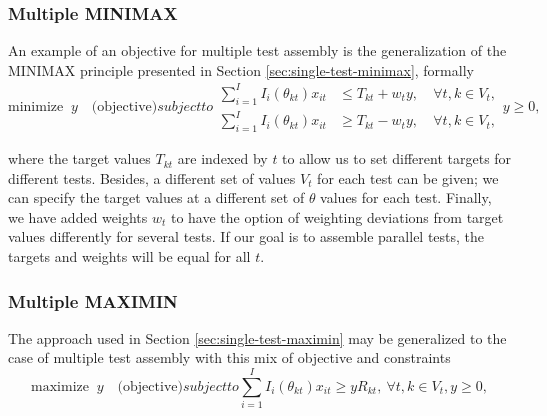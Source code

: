 \subsubsection{Multiple MINIMAX}

An example of an objective for multiple test assembly is the generalization of the MINIMAX principle presented in Section \ref{sec:single-test-minimax}, formally
\begin{subequations}
	\begin{equation}
	\mbox{minimize } \ y \quad \mbox{(objective)}
	\end{equation}
	subject to
	\begin{alignat}{2}
	\label{eq:MMINIMAX1}
	\sum_{i=1}^I I_i(\theta_{kt}) x_{it} & \le T_{kt} + w_ty, \ & \forall t,k \in V_t,\\
	\label{eq:MMINIMAX2}
	\sum_{i=1}^I I_i(\theta_{kt}) x_{it} & \ge T_{kt} - w_ty, \ & \forall t,k \in V_t,
	\end{alignat}
	\begin{equation*}
	y \ge 0,
	\end{equation*}
	\label{eq:MMINIMAX}
\end{subequations}

\noindent where the target values $T_{kt}$ are indexed by $t$ to allow us to set different targets for different tests. Besides, a different set of values $V_t$ for each test can be given; we can specify the target values at a different set of $\theta$ values for each test. Finally, we have added weights $w_t$ to have the option of weighting deviations from target values differently for several tests. If our goal is to assemble parallel tests, the targets and weights will be equal for all $t$.

\subsubsection{Multiple MAXIMIN}

The approach used in Section \ref{sec:single-test-maximin} may be generalized to the case of multiple test assembly with this mix of objective and constraints
\begin{subequations}\label{eq:maximinmodel}
	\begin{equation}
	\mbox{maximize } \ y \quad \mbox{(objective)}
	\end{equation}
	subject to
	\begin{equation}\label{eq:MMAXIMIN2}
	\sum_{i=1}^I I_i(\theta_{kt}) x_{it} \ge yR_{kt}, \ \forall t,k \in V_t,
	\end{equation}
	\begin{equation*}
	y \ge 0,
	\end{equation*}
\end{subequations}

